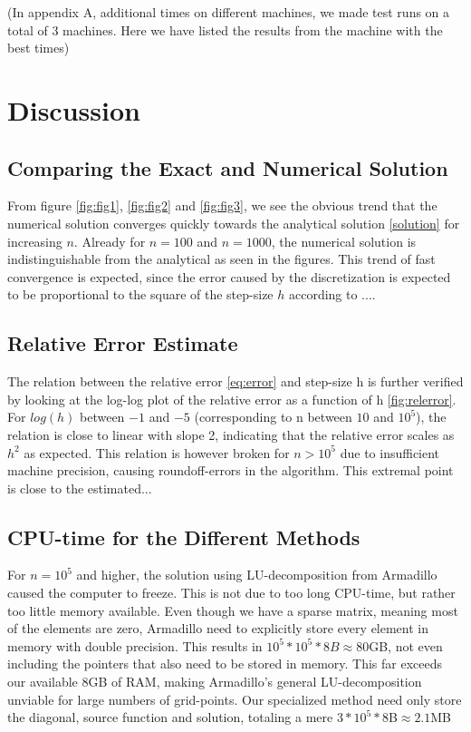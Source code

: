 \documentclass[12pt]{article}
\numberwithin{equation}{section}     %
\begin{document}
(In appendix A, additional times on different machines, we made test runs on a total of 3 machines. Here we have listed the results from the machine with the best times)

\section{Discussion}
\subsection{Comparing the Exact and Numerical Solution}
From figure \ref{fig:fig1}, \ref{fig:fig2} and \ref{fig:fig3}, we see the obvious trend that the numerical solution converges quickly towards the analytical solution \ref{solution} for increasing $n$. Already for $n=100$ and $n=1000$, the numerical solution is indistinguishable from the analytical as seen in the figures. This trend of fast convergence is expected, since the error caused by the discretization is expected to be proportional to the square of the step-size $h$ according to ....\\

\subsection{Relative Error Estimate}
The relation between the relative error \ref{eq:error} and step-size h is further verified by looking at the log-log plot of the relative error as a function of h \ref{fig:relerror}. For $log(h)$ between $-1$ and $-5$ (corresponding to n between $10$  and $10^5$), the relation is close to linear with slope 2, indicating that the relative error scales as $h^2$ as expected. This relation is however broken for $n>10^5$ due to insufficient machine precision, causing roundoff-errors in the algorithm. This extremal point is close to the estimated...

\subsection{CPU-time for the Different Methods}
For $n = 10^5$ and higher, the solution using LU-decomposition from Armadillo caused the computer to freeze. This is not due to too long CPU-time, but rather too little memory available. Even though we have a sparse matrix, meaning most of the elements are zero, Armadillo need to explicitly store every element in memory with double precision. This results in $10^5 * 10^5 *8B \approx 80$GB, not even including the pointers that also need to be stored in memory. This far exceeds our available 8GB of RAM, making Armadillo's general LU-decomposition unviable for large numbers of grid-points. Our specialized method need only store the diagonal, source function and solution, totaling a mere $3*10^5*8$B$ \approx 2.1$MB
\end{document}
